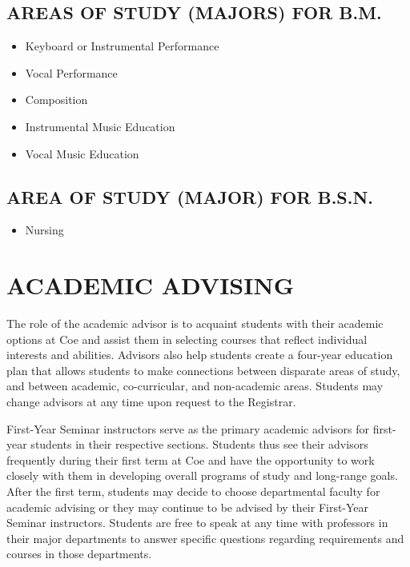 \documentclass[
  letterpaper,
]{scrbook}
\providecommand{\tightlist}{%
  \setlength{\itemsep}{0pt}\setlength{\parskip}{0pt}}
\begin{document}
\section{AREAS OF STUDY (MAJORS) FOR
B.M.}\label{areas-of-study-majors-for-b.m.}

\begin{itemize}
\tightlist
\item
  Keyboard or Instrumental Performance
\item
  Vocal Performance
\item
  Composition
\item
  Instrumental Music Education
\item
  Vocal Music Education
\end{itemize}

\section{AREA OF STUDY (MAJOR) FOR
B.S.N.}\label{area-of-study-major-for-b.s.n.}

\begin{itemize}
\tightlist
\item
  Nursing
\end{itemize}

\chapter{ACADEMIC ADVISING}\label{sec-academic-advising}

The role of the academic advisor is to acquaint students with their
academic options at Coe and assist them in selecting courses that
reflect individual interests and abilities. Advisors also help students
create a four-year education plan that allows students to make
connections between disparate areas of study, and between academic,
co-curricular, and non-academic areas. Students may change advisors at
any time upon request to the Registrar.

First-Year Seminar instructors serve as the primary academic advisors
for first-year students in their respective sections. Students thus see
their advisors frequently during their first term at Coe and have the
opportunity to work closely with them in developing overall programs of
study and long-range goals. After the first term, students may decide to
choose departmental faculty for academic advising or they may continue
to be advised by their First-Year Seminar instructors. Students are free
to speak at any time with professors in their major departments to
answer specific questions regarding requirements and courses in those
departments.
\end{document}
